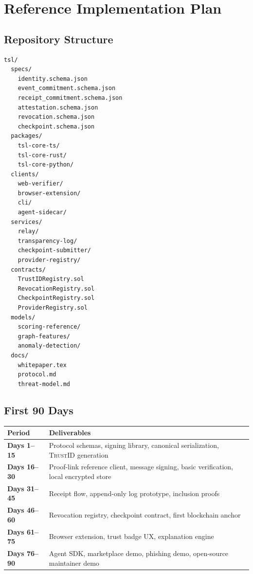 \documentclass[11pt]{article}
\newcommand{\TrustID}{\textsc{TrustID}}
\begin{document}
\section{Reference Implementation Plan}

\subsection{Repository Structure}

\begin{lstlisting}[style=tslcode]
tsl/
  specs/
    identity.schema.json
    event_commitment.schema.json
    receipt_commitment.schema.json
    attestation.schema.json
    revocation.schema.json
    checkpoint.schema.json
  packages/
    tsl-core-ts/
    tsl-core-rust/
    tsl-core-python/
  clients/
    web-verifier/
    browser-extension/
    cli/
    agent-sidecar/
  services/
    relay/
    transparency-log/
    checkpoint-submitter/
    provider-registry/
  contracts/
    TrustIDRegistry.sol
    RevocationRegistry.sol
    CheckpointRegistry.sol
    ProviderRegistry.sol
  models/
    scoring-reference/
    graph-features/
    anomaly-detection/
  docs/
    whitepaper.tex
    protocol.md
    threat-model.md
\end{lstlisting}

\subsection{First 90 Days}

\begin{center}
\begin{tabularx}{\textwidth}{>{\bfseries}p{} X}
\toprule
Period & Deliverables \\
\midrule
Days 1--15 & Protocol schemas, signing library, canonical serialization, \TrustID{} generation \\
Days 16--30 & Proof-link reference client, message signing, basic verification, local encrypted store \\
Days 31--45 & Receipt flow, append-only log prototype, inclusion proofs \\
Days 46--60 & Revocation registry, checkpoint contract, first blockchain anchor \\
Days 61--75 & Browser extension, trust badge UX, explanation engine \\
Days 76--90 & Agent SDK, marketplace demo, phishing demo, open-source maintainer demo \\
\bottomrule
\end{tabularx}
\end{center}
\end{document}
